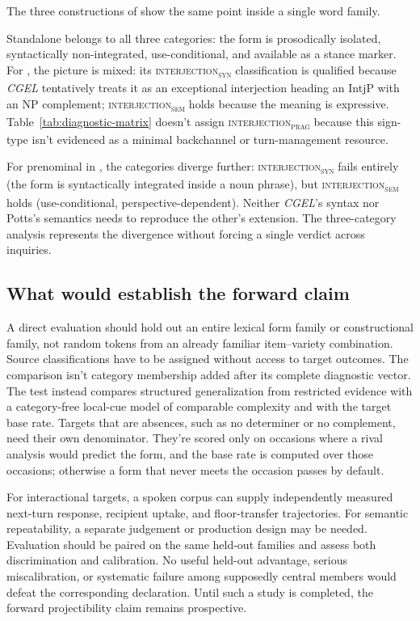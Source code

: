\documentclass[12pt]{article}
\newcommand{\intj}[1]{\textsc{interjection\textsubscript{#1}}}
\begin{document}
The three constructions of  show the same point inside a
single word family.

Standalone
 belongs to all three categories: the form is prosodically
isolated, syntactically non-integrated, use-conditional, and available
as a stance marker. For , the picture
is mixed: its \intj{syn} classification is qualified because
\textit{CGEL} tentatively treats it as an exceptional interjection heading an
IntjP with an NP complement;
\intj{sem} holds because the meaning is expressive. Table~\ref{tab:diagnostic-matrix}
doesn't assign \intj{prag} because this sign-type isn't evidenced as a
minimal backchannel or turn-management resource.

For prenominal  in , the categories
diverge further: \intj{syn} fails entirely (the
form is syntactically integrated inside a noun phrase), but
\intj{sem} holds (use-conditional, perspective-dependent). Neither
\textit{CGEL}'s syntax nor Potts's semantics needs to reproduce the other's
extension. The three-category analysis represents the divergence without
forcing a single verdict across inquiries.

\subsection{What would establish the forward claim}

A direct evaluation should hold out an entire lexical form family or
constructional family, not random tokens from an already familiar
item--variety combination. Source classifications have to be assigned without
access to target outcomes. The comparison isn't category membership added
after its complete diagnostic vector. The test instead compares structured generalization from
restricted evidence with a category-free local-cue model of
comparable complexity and with the target base rate. Targets that are
absences, such as no determiner or no complement, need their own
denominator. They're scored only on occasions where a rival analysis would
predict the form, and the base rate is computed over those occasions;
otherwise a form that never meets the occasion passes by default.

For interactional targets, a spoken corpus can supply independently measured
next-turn response, recipient uptake, and floor-transfer trajectories. For
semantic repeatability, a separate judgement or production design may be
needed. Evaluation should be paired on the same held-out families and assess
both discrimination and calibration. No useful held-out advantage, serious
miscalibration, or systematic failure among supposedly central members would
defeat the corresponding declaration. Until such a study is completed, the
forward projectibility claim remains prospective.
\end{document}
